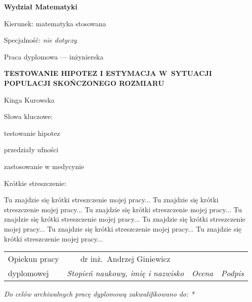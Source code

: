 \documentclass[12pt,a4paper,twoside]{book}
\begin{document}
\begin{titlepage}
\noindent\textbf{\large Wydział Matematyki}
\par\medskip\noindent
Kierunek: matematyka stosowana
\par\noindent
Specjalność: \textit{nie dotyczy}
\vspace*{36pt}
\begin{center}
\LARGE Praca dyplomowa --- inżynierska
\end{center}
\vspace*{24pt}
\begin{center}
\uppercase{\Large\bfseries%
Testowanie hipotez i estymacja w~sytuacji populacji sko\'nczonego rozmiaru}
\end{center}
\vspace*{12pt}
\begin{center}
Kinga Kurowska
\end{center}
\vspace*{12pt}
\begin{flushright}
Słowa kluczowe:\par\noindent
testowanie hipotez\par\noindent
przedziały ufności\par\noindent
zastosowanie w medycynie\par\noindent
\end{flushright}
\begin{flushleft}
Krótkie streszczenie:\par
Tu znajdzie się krótki streszczenie mojej pracy... Tu znajdzie się krótki streszczenie mojej pracy... Tu znajdzie się krótki streszczenie mojej pracy... Tu znajdzie się krótki streszczenie mojej pracy... Tu znajdzie się krótki streszczenie mojej pracy... Tu znajdzie się krótki streszczenie mojej pracy... Tu znajdzie się krótki streszczenie mojej pracy...
\smallskip
\end{flushleft}
\begin{tabularx}{\textwidth}{|l|c|X|X|}
\hline
{\footnotesize Opiekun pracy} & {\small dr inż.\ Andrzej Giniewicz} &  &  \\
\cline{2-4}
{\footnotesize dyplomowej} & \textit{\footnotesize Stopień naukowy, imię i nazwisko} & \textit{\footnotesize Ocena} & \textit{\footnotesize Podpis} \\
\hline
\end{tabularx}
\smallskip
\begin{flushleft}
\small\itshape
Do celów archiwalnych pracę dyplomową zakwalifikowano do: *

\end{flushleft}
\end{titlepage}
\end{document}

